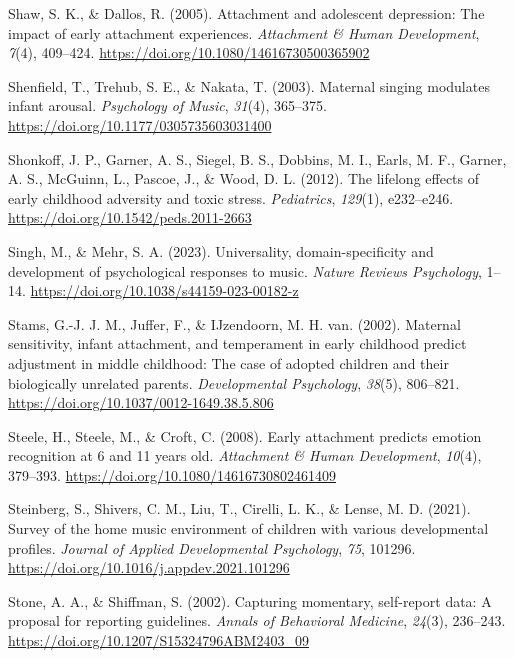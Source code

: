 \documentclass[
]{article}
\newlength{\cslhangindent}
\newenvironment{CSLReferences}[2] %
 {\begin{list}{}{%
  \setlength{\itemindent}{0pt}
  \setlength{\leftmargin}{0pt}
  \setlength{\parsep}{0pt}
  \ifodd #1
   \setlength{\leftmargin}{\cslhangindent}
   \setlength{\itemindent}{-1\cslhangindent}
  \fi
  \setlength{\itemsep}{#2\baselineskip}}}
 {\end{list}}
\begin{document}
\begin{CSLReferences}{1}{0}
Shaw, S. K., \& Dallos, R. (2005). Attachment and adolescent depression:
{The} impact of early attachment experiences. \emph{Attachment \& Human
Development}, \emph{7}(4), 409--424.
\url{https://doi.org/10.1080/14616730500365902}

Shenfield, T., Trehub, S. E., \& Nakata, T. (2003). Maternal singing
modulates infant arousal. \emph{Psychology of Music}, \emph{31}(4),
365--375. \url{https://doi.org/10.1177/0305735603031400}

Shonkoff, J. P., Garner, A. S., Siegel, B. S., Dobbins, M. I., Earls, M.
F., Garner, A. S., McGuinn, L., Pascoe, J., \& Wood, D. L. (2012). The
lifelong effects of early childhood adversity and toxic stress.
\emph{Pediatrics}, \emph{129}(1), e232--e246.
\url{https://doi.org/10.1542/peds.2011-2663}

Singh, M., \& Mehr, S. A. (2023). Universality, domain-specificity and
development of psychological responses to music. \emph{Nature Reviews
Psychology}, 1--14. \url{https://doi.org/10.1038/s44159-023-00182-z}

Stams, G.-J. J. M., Juffer, F., \& IJzendoorn, M. H. van. (2002).
Maternal sensitivity, infant attachment, and temperament in early
childhood predict adjustment in middle childhood: {The} case of adopted
children and their biologically unrelated parents. \emph{Developmental
Psychology}, \emph{38}(5), 806--821.
\url{https://doi.org/10.1037/0012-1649.38.5.806}

Steele, H., Steele, M., \& Croft, C. (2008). Early attachment predicts
emotion recognition at 6 and 11 years old. \emph{Attachment \& Human
Development}, \emph{10}(4), 379--393.
\url{https://doi.org/10.1080/14616730802461409}

Steinberg, S., Shivers, C. M., Liu, T., Cirelli, L. K., \& Lense, M. D.
(2021). Survey of the home music environment of children with various
developmental profiles. \emph{Journal of Applied Developmental
Psychology}, \emph{75}, 101296.
\url{https://doi.org/10.1016/j.appdev.2021.101296}

Stone, A. A., \& Shiffman, S. (2002). Capturing momentary, self-report
data: {A} proposal for reporting guidelines. \emph{Annals of Behavioral
Medicine}, \emph{24}(3), 236--243.
\url{https://doi.org/10.1207/S15324796ABM2403_09}


\end{CSLReferences}
\end{document}
